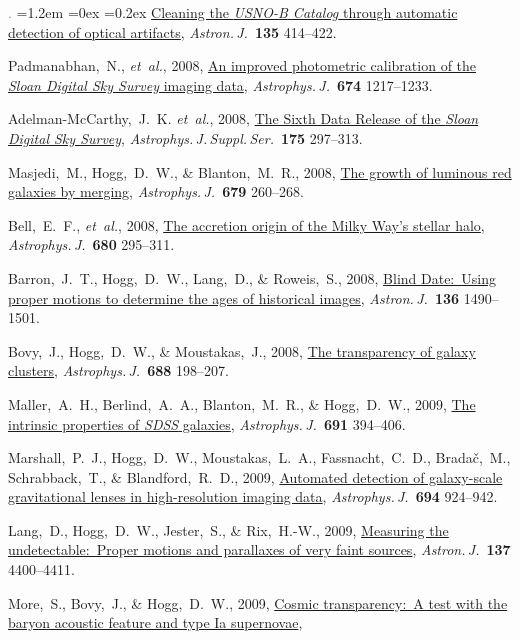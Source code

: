 \documentclass[10pt,letterpaper]{article}
\newcommand{\acronym}[1]{{\small{#1}}}
\newcommand{\foreign}[1]{\textsl{#1}}
\newcommand{\etal}{\foreign{et~al.}}
\newcommand{\project}[1]{\textsl{#1}}
\newcommand{\doi}[2]{\href{http://dx.doi.org/#1}{{#2}}}
\newcommand{\deemph}[1]{\textcolor{grey}{\footnotesize{#1}}}
\newcommand{\pubnumber}[1]{\deemph{{#1}.}}
\newcounter{refpubnum}
\newcommand{\hogglist}{%
    \rightmargin=0in
    \leftmargin=1.2em
    \topsep=0ex
    \partopsep=0pt
    \itemsep=0.2ex
    \parsep=0pt
    \itemindent=-1.0\leftmargin
    \listparindent=0.0\leftmargin
    \settowidth{\labelsep}{~}
    \usecounter{refpubnum}
  }
\begin{document}
\begin{list}{\pubnumber{\therefpubnum}}{\hogglist}
\doi{10.1088/0004-6256/135/1/414}{Cleaning the \project{\acronym{USNO-B} Catalog} through automatic detection of optical artifacts},
\textit{Astron.\,J.}\ \textbf{135} 414--422.
\item
Padmanabhan,~N., \etal, 2008,
\doi{10.1086/524677}{An improved photometric calibration of the \project{Sloan Digital Sky Survey} imaging data},
\textit{Astrophys.\,J.}\ \textbf{674} 1217--1233.
\item
Adelman-McCarthy,~J.~K. \etal, 2008,
\doi{10.1086/524984}{The Sixth Data Release of the \project{Sloan Digital Sky Survey}},
\textit{Astrophys.\,J.\,Suppl.\,Ser.}\ \textbf{175} 297--313.
\item
Masjedi,~M., Hogg,~D.~W., \& Blanton,~M.~R., 2008,
\doi{10.1086/586696}{The growth of luminous red galaxies by merging},
\textit{Astrophys.\,J.}\ \textbf{679} 260--268.
\item
Bell,~E.~F., \etal, 2008,
\doi{10.1086/588032}{The accretion origin of the Milky Way's stellar halo},
\textit{Astrophys.\,J.}\ \textbf{680} 295--311.
\item
Barron,~J.~T., Hogg,~D.~W., Lang,~D., \& Roweis,~S., 2008,
\doi{10.1088/0004-6256/136/4/1490}{Blind Date:\ Using proper motions to determine the ages of historical images},
\textit{Astron.\,J.}\ \textbf{136} 1490--1501.
\item
Bovy,~J., Hogg,~D.~W., \& Moustakas,~J., 2008,
\doi{10.1086/592187}{The transparency of galaxy clusters},
\textit{Astrophys.\,J.}\ \textbf{688} 198--207.
\item
Maller,~A.~H., Berlind,~A.~A., Blanton,~M.~R., \& Hogg,~D.~W., 2009,
\doi{10.1088/0004-637X/691/1/394}{The intrinsic properties of \project{\acronym{SDSS}} galaxies},
\textit{Astrophys.\,J.}\ \textbf{691} 394--406.
\item
Marshall,~P.~J., Hogg,~D.~W., Moustakas,~L.~A., Fassnacht,~C.~D.,
Brada\v{c},~M., Schrabback,~T., \& Blandford,~R.~D., 2009,
\doi{10.1088/0004-637X/694/2/924}{Automated detection of galaxy-scale gravitational lenses in high-resolution imaging data},
\textit{Astrophys.\,J.}\ \textbf{694} 924--942.
\item
Lang,~D., Hogg,~D.~W., Jester,~S., \& Rix,~H.-W., 2009,
\doi{10.1088/0004-6256/137/5/4400}{Measuring the undetectable:\ Proper motions and parallaxes of very faint sources},
\textit{Astron.\,J.}\ \textbf{137} 4400--4411.
\item
More,~S., Bovy,~J., \& Hogg,~D.~W., 2009,
\doi{10.1088/0004-637X/696/2/1727}{Cosmic transparency:\ A test with the baryon acoustic feature and type Ia supernovae},

\end{list}
\end{document}

